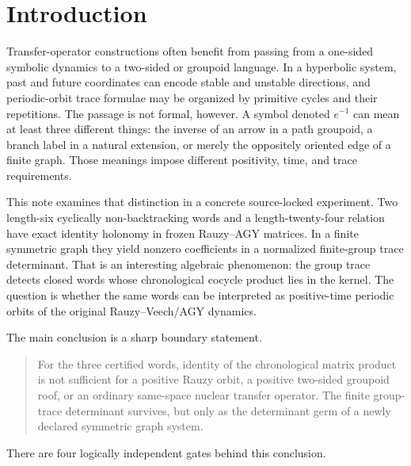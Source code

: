 \section{Introduction}
\label{sec:introduction}

Transfer-operator constructions often benefit from passing from a one-sided
symbolic dynamics to a two-sided or groupoid language.  In a hyperbolic
system, past and future coordinates can encode stable and unstable directions,
and periodic-orbit trace formulae may be organized by primitive cycles and
their repetitions.  The passage is not formal, however.  A symbol denoted
$e^{-1}$ can mean at least three different things: the inverse of an arrow in
a path groupoid, a branch label in a natural extension, or merely the
oppositely oriented edge of a finite graph.  Those meanings impose different
positivity, time, and trace requirements.

This note examines that distinction in a concrete source-locked experiment.
Two length-six cyclically non-backtracking words and a length-twenty-four
relation have exact identity holonomy in frozen Rauzy--AGY matrices.  In a
finite symmetric graph they yield nonzero coefficients in a normalized
finite-group trace determinant.  That is an interesting algebraic
phenomenon: the group trace detects closed words whose chronological cocycle
product lies in the kernel.  The question is whether the same words can be
interpreted as positive-time periodic orbits of the original
Rauzy--Veech/AGY dynamics.

The main conclusion is a sharp boundary statement.

\begin{quote}
For the three certified words, identity of the chronological matrix product is
not sufficient for a positive Rauzy orbit, a positive two-sided groupoid roof,
or an ordinary same-space nuclear transfer operator.  The finite group-trace
determinant survives, but only as the determinant germ of a newly declared
symmetric graph system.
\end{quote}

There are four logically independent gates behind this conclusion.


